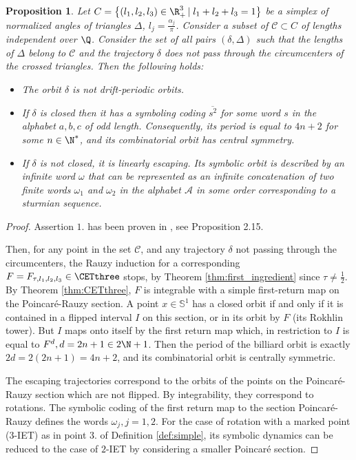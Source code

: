 \documentclass[12pt]{article}
\newtheorem{proposition}{Proposition}
\theoremstyle{definition}
\begin{document}
\begin{proposition}\label{thm:generic}
Let $C=\left\{
(l_1, l_2, l_3) \in {\R}^3_+ \left|\right. l_1+l_2+l_3=1
\right\}$ be a simplex of normalized angles of triangles $\Delta$, $l_j=\frac{\alpha_j}{\pi}$. Consider a subset of $\mathcal{C} \subset C$ of lengths independent over $\Q$. Consider the set of all pairs $(\delta, \Delta)$ such that the lengths of $\Delta$ belong to $\mathcal{C}$ and the trajectory $\delta$ does not pass through the circumcenters of the crossed triangles. Then the following holds:
\begin{itemize}
\item[1.]The orbit $\delta$ is not drift-periodic orbits.
\item[2.] If $\delta$ is closed then it has a symboling coding $\overline{s^2}$ for some word $s$ in the alphabet $a,b,c$ of odd length. Consequently, its period is equal to $4n+2$ for some $n \in \N^*$, and its combinatorial orbit has central symmetry.
\item[3.] If $\delta$ is not closed, it is linearly escaping. Its symbolic orbit is described by an infinite word $\omega$ that can be represented as an infinite concatenation of two finite words $\omega_1$ and $\omega_2$ in the alphabet $\mathcal{A}$ in some order corresponding to a sturmian sequence. 
\end{itemize}

\end{proposition}

\begin{proof}
Assertion $1.$ has been proven in \cite{BDFI18}, see Proposition 2.15. 

Then, for any point in the set $\mathcal{C}$, and any trajectory $\delta$ not passing through the circumcenters, the Rauzy induction for a corresponding  $F=F_{\tau, l_1, l_2, l_3} \in \CETthree$ stops, by Theorem \ref{thm:first_ingredient} since $\tau \neq \frac{1}{2}$. By Theorem \ref{thm:CETthree}, $F$ is integrable with a simple first-return map on the Poincaré-Rauzy section. A point $x \in \mathbb{S}^1$ has a closed orbit if and only if it is contained in a flipped interval $I$ on this section, or in its orbit by $F$ (its Rokhlin tower). But $I$ maps onto itself by the first return map which, in restriction to $I$ is equal to $F^d, d=2n+1 \in 2 \N+1$. Then the period of the billiard orbit is exactly $2d = 2 (2n+1)=4n+2$, and its combinatorial orbit is centrally symmetric.

The escaping trajectories correspond to the orbits of the points on the Poincaré-Rauzy section which are not flipped. By integrability, they correspond to rotations. The symbolic coding of the first return map to the section Poincaré-Rauzy defines the words $\omega_j, j=1,2$. For the case of rotation with a marked point ($3$-IET) as in point $3.$ of Definition \ref{def:simple}, its symbolic dynamics can be reduced to the case of $2$-IET by considering a smaller Poincaré section.
\end{proof}
\end{document}
